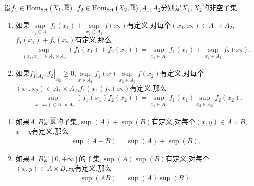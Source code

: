 \begin{corollary}{}{}
	设$f_{1}\in\operatorname{Hom}_{\mathsf{Set}}\left(X_{1},\overline{\mathbb{R}}\right),f_{2}\in\operatorname{Hom}_{\mathsf{Set}}\left(X_{2},\overline{\mathbb{R}}\right)$,$A_{1},A_{2}$分别是$X_{1},X_{2}$的非空子集.
	\begin{enumerate}
		\item 如果$\sup\limits_{x_{1}\in A_{1}}f_{1}\left(x_{1}\right)+\sup\limits_{x_{2}\in A_{2}}f\left(x_{2}\right)$有定义,对每个$\left(x_{1},x_{2}\right)\in A_{1}\times A_{2}$,$f_{1}\left(x_{1}\right)+f_{2}\left(x_{2}\right)$有定义,那么
		\begin{align*}
			\sup\limits_{\left(x_{1},x_{2}\right)\in A_{1}\times A_{2}}\left(f_{1}\left(x_{1}\right)+f_{2}\left(x_{2}\right)\right)=\sup\limits_{x_{1}\in A_{1}}f_{1}\left(x_{1}\right)+\sup\limits_{x_{2}\in A_{2}}f_{2}\left(x_{2}\right).
		\end{align*}
		\item 如果$f_{1}|_{A_{1}},f_{2}|_{A_{2}}\geqslant 0$,$\sup\limits_{x\in A_{1}}f_{1}\left(x\right)\sup\limits_{x_{2}\in A_{2}}f\left(x_{2}\right)$有定义,对每个$\left(x_{1},x_{2}\right)\in A_{1}\times A_{2}$,$f_{1}\left(x_{1}\right)f_{2}\left(x_{2}\right)$有定义,那么
		\begin{align*}
			\sup\limits_{\left(x_{1},x_{2}\right)\in A_{1}\times A_{2}}\left(f_{1}\left(x_{1}\right)f_{2}\left(x_{2}\right)\right)=\sup\limits_{x_{1}\in A_{1}}f_{1}\left(x_{1}\right)\sup\limits_{x_{2}\in A_{2}}f_{2}\left(x_{2}\right).
		\end{align*}
	\end{enumerate}
\end{corollary}

\begin{corollary}{}{}
	\begin{enumerate}
		\item 如果$A,B$是$\overline{\mathbb{R}}$的子集,$\sup\left(A\right)+\sup\left(B\right)$有定义,对每个$\left(x,y\right)\in A\times B$,$x+y$有定义,那么
		\begin{align*}
			\sup\left(A+B\right)=\sup\left(A\right)+\sup\left(B\right).
		\end{align*}
		\item 如果$A,B$是$\left[0,+\infty\right]$的子集,$\sup\left(A\right)\sup\left(B\right)$有定义,对每个$\left(x,y\right)\in A\times B$,$xy$有定义,那么
		\begin{align*}
			\sup\left(AB\right)=\sup\left(A\right)\sup\left(B\right).
		\end{align*}
	\end{enumerate}
\end{corollary}

